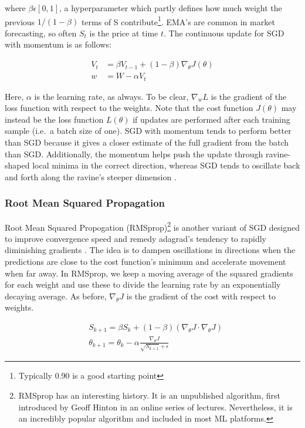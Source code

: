 \noindent where $ \beta \epsilon [0,1]$, a hyperparameter which partly defines how much weight the previous $ 1/(1-\beta) $ terms of S contribute\footnote{Typically 0.90 is a good starting point}. EMA's are common in market forecasting, so often $ S_t $  is the price at time $ t $. The continuous update for SGD with momentum is as follows:

\begin{align}
    V_t &= \beta V_{t-1}  + \left( 1 - \beta \right) \nabla_\theta J \left( \theta \right)\\
    w &= W - \alpha V_t
\end{align}


Here, $ \alpha $  is the learning rate, as always. To be clear, $\nabla_w L$ is the gradient of the loss function with respect to the weights. Note that the cost function $ J(\theta) $ may instead be the loss function $ L(\theta) $ if updates are performed after each training sample (i.e.~a batch size of one). SGD with momentum tends to perform better than SGD because it gives a closer estimate of the full gradient from the batch than SGD. Additionally, the momentum helps push the update through ravine-shaped local minima in the correct direction, whereas SGD tends to oscillate back and forth along the ravine's steeper dimension \cite{qian1999momentum}.

\subsubsection{Root Mean Squared Propagation}
Root Mean Squared Propogation (RMSprop)\footnote{RMSprop has an interesting history. It is an unpublished algorithm, first introduced by Geoff Hinton in an online series of lectures. Nevertheless, it is an incredibly popular algorithm and included in most ML platforms.} is another variant of SGD designed to improve convergence speed and remedy adagrad's \cite{adagrad} tendency to rapidly diminishing gradients \cite{improving-rprop}\cite{2017marginal-adagrad}. The idea is to dampen oscillations in directions when the predictions are close to the cost function's minimum and accelerate movement when far away. In RMSprop, we keep a moving average of the squared gradients for each weight and use these to divide the learning rate by an exponentially decaying average. As before, $\nabla_\theta J$ is the gradient of the cost with respect to weights.

\begin{align}
    \label{eqn:RMS_Prop}
    & S_{k+1} = \beta S_k + (1 - \beta)(\nabla_\theta J \cdot \nabla_\theta J) \\
    & \theta_{k+1} = \theta_k - \alpha \frac{\nabla_\theta J}{\sqrt{S_{k+1}} + \epsilon}
\end{align}


